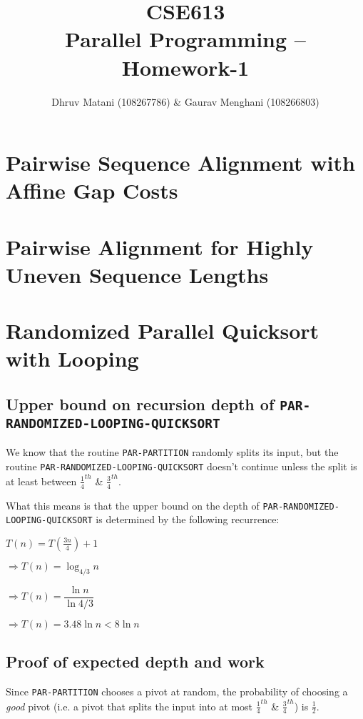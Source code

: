 \documentclass{article}
\title{CSE613\\Parallel Programming -- Homework-1}
\author{Dhruv Matani (108267786) \& Gaurav Menghani (108266803)}
\begin{document}
\maketitle

\clearpage

\tableofcontents

\clearpage

\section{Pairwise Sequence Alignment with Affine Gap Costs}

\clearpage

\section{Pairwise Alignment for Highly Uneven Sequence Lengths}

\clearpage

\section{Randomized Parallel Quicksort with Looping}

\subsection{Upper bound on recursion depth of \texttt{PAR-RANDOMIZED-LOOPING-QUICKSORT}}

We know that the routine \texttt{PAR-PARTITION} randomly splits its
input, but the routine \texttt{PAR-RANDOMIZED-LOOPING-QUICKSORT}
doesn't continue unless the split is at least between
$\frac{1}{4}^{th}$ \& $\frac{3}{4}^{th}$.

What this means is that the upper bound on the depth of
\texttt{PAR-RANDOMIZED-LOOPING-QUICKSORT} is determined by the
following recurrence:

$T(n) = T(\frac{3n}{4}) + 1$

$\Rightarrow T(n) = \log_{4/3}{n}$

$\Rightarrow T(n) = \dfrac{\ln{n}}{\ln{4/3}}$

$\Rightarrow T(n) = 3.48\ln{n} < 8\ln{n}$

\subsection{Proof of expected depth and work}

Since \texttt{PAR-PARTITION} chooses a pivot at random, the
probability of choosing a \textit{good} pivot (i.e. a pivot that
splits the input into at most $\frac{1}{4}^{th}$ \&
$\frac{3}{4}^{th}$) is $\frac{1}{2}$.
\end{document}
